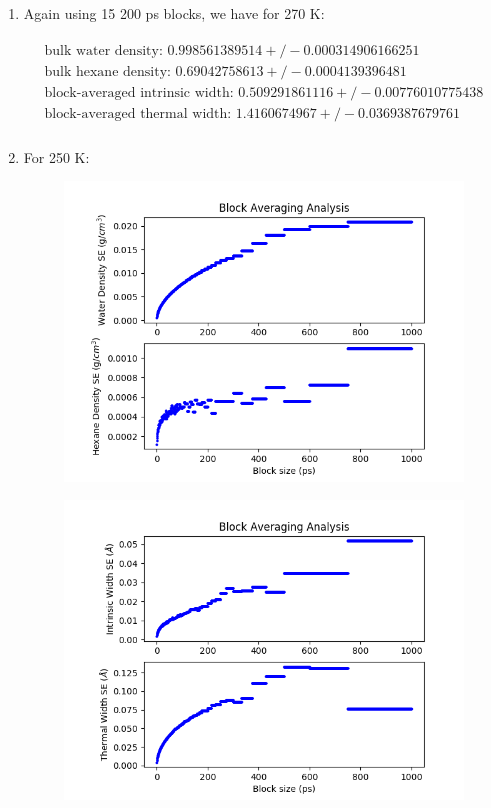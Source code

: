 \documentclass[12pt,reqno]{amsart}
\numberwithin{equation}{section}
\begin{document}
\begin{enumerate}
\item Again using 15 200 ps blocks, we have for 270 K:

\begin{align}
\begin{split}
\text{bulk water density: } 0.998561389514  +/- 0.000314906166251 \\
\text{bulk hexane density: } 0.69042758613  +/- 0.0004139396481 \\
\text{block-averaged intrinsic width: } 0.509291861116  +/- 0.00776010775438\\
\text{block-averaged thermal width: } 1.4160674967  +/- 0.0369387679761 \\
\end{split}
\end{align} 

\item For 250 K: 


\begin{figure}[H]
\centering
\includegraphics[scale=0.6]{density_profile_block_averaging_1_full-250-1bead}
\end{figure}

\begin{figure}[H]
\centering
\includegraphics[scale=0.6]{density_profile_block_averaging_2_full-250-1bead}
\end{figure}


\end{enumerate}
\end{document}
